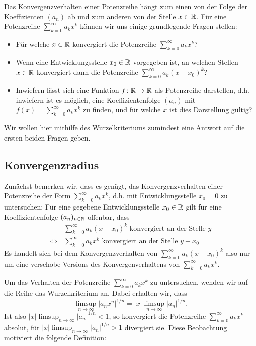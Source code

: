 \documentclass[a4paper,10pt]{article}
\begin{document}
Das Konvergenzverhalten einer Potenzreihe hängt zum einen von der Folge der Koeffizienten $(a_n)$ ab und zum anderen von der Stelle $x \in \mathbb{R}$. Für eine Potenzreihe $\sum_{k=0}^\infty a_k x^k$ können wir uns einige grundlegende Fragen stellen:
\begin{itemize}
 \item
  Für welche $x \in \mathbb{R}$ konvergiert die Potenzreihe $\sum_{k=0}^\infty a_k x^k$?
 \item
  Wenn eine Entwicklungsstelle $x_0 \in \mathbb{R}$ vorgegeben ist, an welchen Stellen $x \in \mathbb{R}$ konvergiert dann die Potenzreihe $\sum_{k=0}^\infty a_k (x-x_0)^k$?
 \item
  Inwiefern lässt sich eine Funktion $f \colon \mathbb{R} \to \mathbb{R}$ als Potenzreihe darstellen, d.h. inwiefern ist es möglich, eine Koeffizientenfolge $(a_n)$ mit $f(x) = \sum_{k=0}^\infty a_k x^k$ zu finden, und für welche $x$ ist dies Darstellung gültig?
\end{itemize}


Wir wollen hier mithilfe des Wurzelkriteriums zumindest eine Antwort auf die ersten beiden Fragen geben.


\subsection{Konvergenzradius}
Zunächst bemerken wir, dass es genügt, das Konvergenzverhalten einer Potenzreihe der Form $\sum_{k=0}^\infty a_k x^k$, d.h. mit Entwicklungsstelle $x_0 = 0$ zu untersuchen: Für eine gegebene Entwicklungsstelle $x_0 \in \mathbb{R}$ gilt für eine Koeffizientenfolge $(a_n)_{n \in \mathbb{N}}$ offenbar, dass
\begin{align*}
 &\sum_{k=0}^\infty a_k (x-x_0)^k \text{ konvergiert an der Stelle } y \\
 \Leftrightarrow\,
 &\sum_{k=0}^\infty a_k x^k \text{ konvergiert an der Stelle } y-x_0
\end{align*}
Es handelt sich bei dem Konvergenzverhalten von $\sum_{k=0}^\infty a_k (x-x_0)^k$ also nur um eine verschobe Versions des Konvergenverhaltens von $\sum_{k=0}^\infty a_k x^k$.


Um das Verhalten der Potenzreihe $\sum_{k=0}^\infty a_k x^k$ zu untersuchen, wenden wir auf die Reihe das Wurzelkriterium an. Dabei erhalten wir, dass
\[
 \limsup_{n \to \infty} |a_n x^n|^{1/n}
 = |x| \limsup_{n \to \infty} |a_n|^{1/n}.
\]
Ist also $|x| \limsup_{n \to \infty} |a_n|^{1/n} < 1$, so konvergiert die Potenzreihe $\sum_{k=0}^\infty a_k x^k$ absolut, für $|x| \limsup_{n \to \infty} |a_n|^{1/n} > 1$ divergiert sie. Diese Beobachtung motiviert die folgende Definition:
\end{document}
